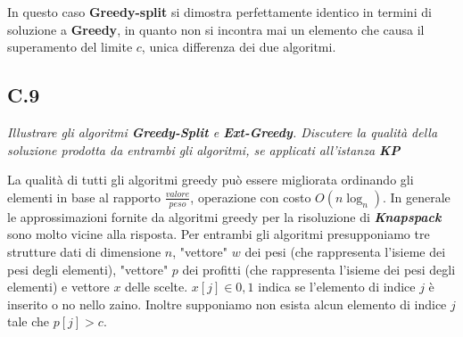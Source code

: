 \documentclass[a4paper]{article}
\newcommand{\imp}[1]{\textbf{\textit{#1}}}
\begin{document}
In questo caso \textbf{Greedy-split} si dimostra perfettamente identico in termini di soluzione a \textbf{Greedy}, in quanto non si incontra mai un elemento che causa il superamento del limite $c$, unica differenza dei due algoritmi.
\newpage
\subsection{C.9}
\emph{Illustrare gli algoritmi \textbf{Greedy-Split} e \textbf{Ext-Greedy}. Discutere la qualità della soluzione prodotta da entrambi gli algoritmi, se applicati all’istanza \textbf{KP}}


La qualità di tutti gli algoritmi greedy può essere migliorata ordinando gli elementi in base al rapporto $\frac{valore}{peso}$, operazione con costo $O(n\log_n)$.
In generale le approssimazioni fornite da algoritmi greedy per la risoluzione di \imp{Knapspack} sono molto vicine alla risposta. %
Per entrambi gli algoritmi presupponiamo tre strutture dati di dimensione $n$, "vettore" $w$ dei pesi (che rappresenta l'isieme dei pesi degli elementi), "vettore" $p$ dei profitti  (che rappresenta l'isieme dei pesi degli elementi) e vettore $x$ delle scelte. $x[j] \in {0,1}$ indica se l'elemento di indice $j$ è inserito o no nello zaino.
Inoltre supponiamo non esista alcun elemento di indice $j$ tale che $p[j] > c$.
\end{document}
